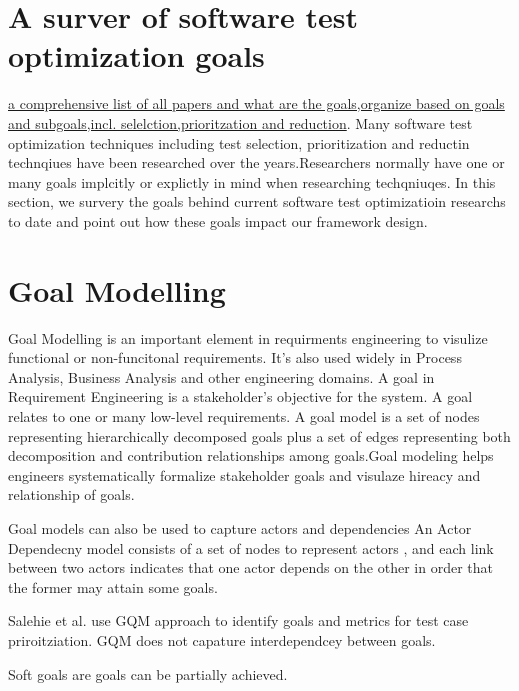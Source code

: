 \section {A surver of software test optimization goals}
\underline{a comprehensive list of all papers and what are the goals,organize
based on goals and subgoals,incl. selelction,prioritzation and reduction}. 
Many software test optimization techniques including test selection,
prioritization and reductin technqiues have been researched over the
years.Researchers normally have one or many goals implcitly or explictly in mind
when researching techqniuqes. In this section, we survery the goals behind
current software test optimizatioin researchs to date and point out how these
goals impact our framework design.


\section {Goal Modelling}
Goal Modelling is an important element in requirments engineering to visulize
functional or non-funcitonal requirements. It's also used widely in Process Analysis, Business Analysis and other engineering domains. A goal in Requirement Engineering is a stakeholder's objective for the system. A goal relates to one or many low-level requirements. A goal
model is a set of nodes representing hierarchically decomposed goals plus a
set of edges representing both decomposition and contribution relationships
among goals\cite{Ernst:2006:VNR:1173697.1174072}.Goal modeling helps engineers systematically formalize stakeholder goals and visulaze hireacy and relationship of goals.

Goal models can also be used to capture actors and dependencies
\cite{Ernst:2006:VNR:1173697.1174072,DBLP:conf/icse/YuM94} An Actor Dependecny
model consists of a set of nodes to represent actors , and each link between two
actors indicates that one actor depends on the other in order that
the former may attain some goals.
 
Salehie et al. use GQM approach to identify goals and  metrics for test case
priroitziation. GQM does not capature interdependcey between goals. 
 
Soft goals are goals can be partially achieved.


